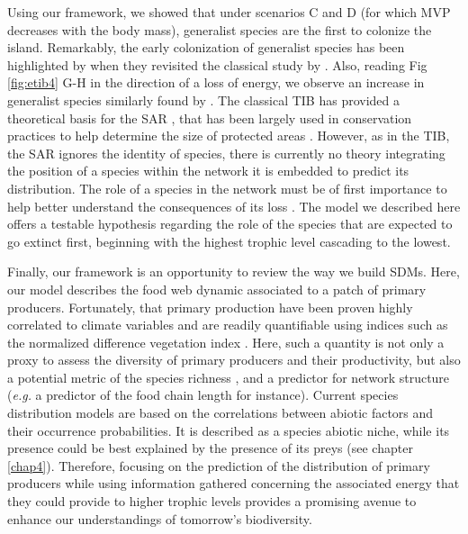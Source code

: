 Using our framework, we showed that under scenarios C and D (for which
MVP decreases with the body mass), generalist species are the first to
colonize the island. Remarkably, the early colonization of generalist
species has been highlighted by \citet{Piechnik2008} when they revisited
the classical study by \citet{Simberloff1969}. Also, reading Fig
\ref{fig:etib4} G-H in the direction of a loss of energy, we observe an
increase in generalist species similarly found by \citet{Clavel2011}.
The classical TIB has provided a theoretical basis for the SAR
\citep{MacArthur1967}, that has been largely used in conservation
practices to help determine the size of protected areas
\citep{Neigel2003}. However, as in the TIB, the SAR ignores the identity
of species, there is currently no theory integrating the position of a
species within the network it is embedded to predict its distribution.
The role of a species in the network must be of first importance to help
better understand the consequences of its loss \citep{Saterberg2013}.
The model we described here offers a testable hypothesis regarding the
role of the species that are expected to go extinct first, beginning
with the highest trophic level cascading to the lowest.

Finally, our framework is an opportunity to review the way we build
SDMs. Here, our model describes the food web dynamic associated to a
patch of primary producers. Fortunately, that primary production have
been proven highly correlated to climate variables
\citep{Wright1983, Hawkins2003, Evans2005} and are readily quantifiable
using indices such as the normalized difference vegetation index
\citep[NDVI][]{Evans2005}. Here, such a quantity is not only a proxy to
assess the diversity of primary producers and their productivity, but
also a potential metric of the species richness \citep{Wright1983}, and
a predictor for network structure (\emph{e.g.} a predictor of the food
chain length for instance). Current species distribution models are
based on the correlations between abiotic factors and their occurrence
probabilities. It is described as a species abiotic niche, while its
presence could be best explained by the presence of its preys (see
chapter \ref{chap4}). Therefore, focusing on the prediction of the
distribution of primary producers while using information gathered
concerning the associated energy that they could provide to higher
trophic levels provides a promising avenue to enhance our understandings
of tomorrow's biodiversity.
